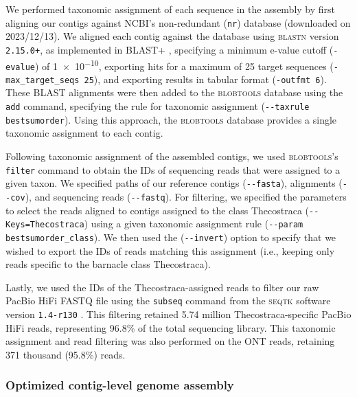 We performed taxonomic assignment of each sequence in the assembly by first aligning
our contigs against NCBI's non-redundant (\texttt{nr}) database (downloaded on
2023/12/13). We aligned each contig against the database using \textsc{blastn} version
\texttt{2.15.0+}, as implemented in \textsc{BLAST+} \citep{camacho_blast_2009},
specifying a minimum e-value cutoff (\texttt{-evalue}) of \num{1e-10}, exporting
hits for a maximum of 25 target sequences (\texttt{-max\_target\_seqs 25}), and exporting
results in tabular format (\texttt{-outfmt 6}). These \textsc{BLAST} alignments
were then added to the \textsc{blobtools} database using the \texttt{add} command,
specifying the rule for taxonomic assignment (\texttt{-{}-taxrule bestsumorder}).
Using this approach, the \textsc{blobtools} database provides a single taxonomic
assignment to each contig.
\vspace{0.1cm}

Following taxonomic assignment of the assembled contigs, we used
\textsc{blobtools}'s \texttt{filter} command to obtain the IDs of sequencing
reads that were assigned to a given taxon. We specified paths of our reference
contigs (\texttt{-{}-fasta}), alignments (\texttt{-{}-cov}), and sequencing reads
(\texttt{-{}-fastq}). For filtering, we specified the parameters to select the reads
aligned to contigs assigned to the class Thecostraca (\texttt{-{}-Keys=Thecostraca})
using a given taxonomic assignment rule (\texttt{-{}-param bestsumorder\_class}). We
then used the (\texttt{-{}-invert}) option to specify that we wished to export the
IDs of reads matching this assignment (i.e., keeping only reads specific to the
barnacle class Thecostraca).
\vspace{0.1cm}

Lastly, we used the IDs of the Thecostraca-assigned reads to filter our raw
PacBio HiFi FASTQ file using the \texttt{subseq} command from the \textsc{seqtk}
software version \texttt{1.4-r130} \citep{li_seqtk}. This
filtering retained 5.74 million Thecostraca-specific PacBio HiFi reads, representing
96.8\% of the total sequencing library. This taxonomic assignment and read
filtering was also performed on the ONT reads, retaining 371 thousand (95.8\%)
reads.

\subsubsection*{Optimized contig-level genome assembly}\label{sec:methods_optimized_assembly}

